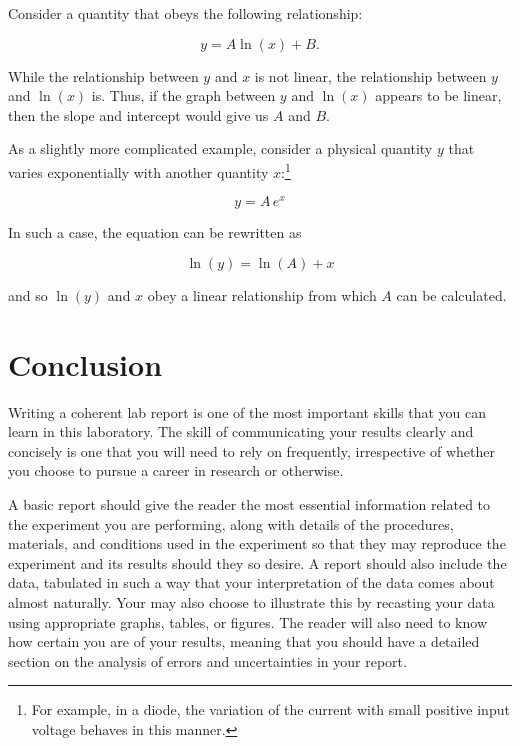 Consider a quantity that obeys the following relationship:

\begin{equation*}
    y = A \ln(x) + B.
\end{equation*}

While the relationship between $y$ and $x$ is not linear, the relationship between $y$ and $\ln(x)$ is. Thus, if the graph between $y$ and $\ln(x)$ appears to be linear, then the slope and intercept would give us $A$ and $B$.


As a slightly more complicated example, consider a physical quantity $y$ that varies exponentially with another quantity $x$:\footnote{For example, in a diode, the variation of the current with small positive input voltage behaves in this manner.}

\begin{equation*}
    y = A\, e^x
\end{equation*}

In such a case, the equation can be rewritten as 

\begin{equation*}
    \ln(y) = \ln(A) + x
\end{equation*}

and so $\ln(y)$ and $x$ obey a linear relationship from which $A$ can be calculated.


\section{Conclusion}

Writing a coherent lab report is one of the most important skills that you can learn in this laboratory. The skill of communicating your results clearly and concisely is one that you will need to rely on frequently, irrespective of whether you choose to pursue a career in research or otherwise. 

A basic report should give the reader the most essential information related to the experiment you are performing, along with details of the procedures, materials, and conditions used in the experiment so that they may reproduce the experiment and its results should they so desire. A report should also include the data, tabulated in such a way that your interpretation of the data comes about almost naturally. Your may also choose to illustrate this by recasting your data using appropriate graphs, tables, or figures. The reader will also need to know how certain you are of your results, meaning that you should have a detailed section on the analysis of errors and uncertainties in your report. 

